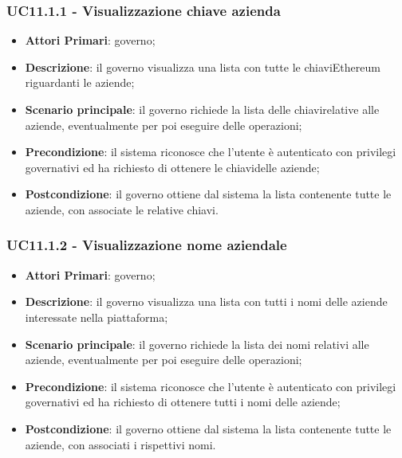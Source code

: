 \subsubsection{UC11.1.1 - Visualizzazione chiave azienda}
\begin{itemize}
	\item \textbf{Attori Primari}: governo;
	\item \textbf{Descrizione}: il governo visualizza una lista con tutte le chiavi\glosp Ethereum riguardanti le aziende;
	\item \textbf{Scenario principale}: il governo richiede la lista delle chiavi\glosp relative alle aziende, eventualmente per poi eseguire delle operazioni;
	\item \textbf{Precondizione}: il sistema riconosce che l'utente è autenticato con privilegi governativi ed ha richiesto di ottenere le chiavi\glosp delle aziende;
	\item \textbf{Postcondizione}: il governo ottiene dal sistema la lista contenente tutte le aziende, con associate le relative chiavi\glo.
\end{itemize}
\subsubsection{UC11.1.2 - Visualizzazione nome aziendale}
\begin{itemize}
	\item \textbf{Attori Primari}: governo;
	\item \textbf{Descrizione}: il governo visualizza una lista con tutti i nomi delle aziende interessate nella piattaforma;
	\item \textbf{Scenario principale}: il governo richiede la lista dei nomi relativi alle aziende, eventualmente per poi eseguire delle operazioni;
	\item \textbf{Precondizione}: il sistema riconosce che l'utente è autenticato con privilegi governativi ed ha richiesto di ottenere tutti i nomi delle aziende;
	\item \textbf{Postcondizione}: il governo ottiene dal sistema la lista contenente tutte le aziende, con associati i rispettivi nomi.
\end{itemize}
